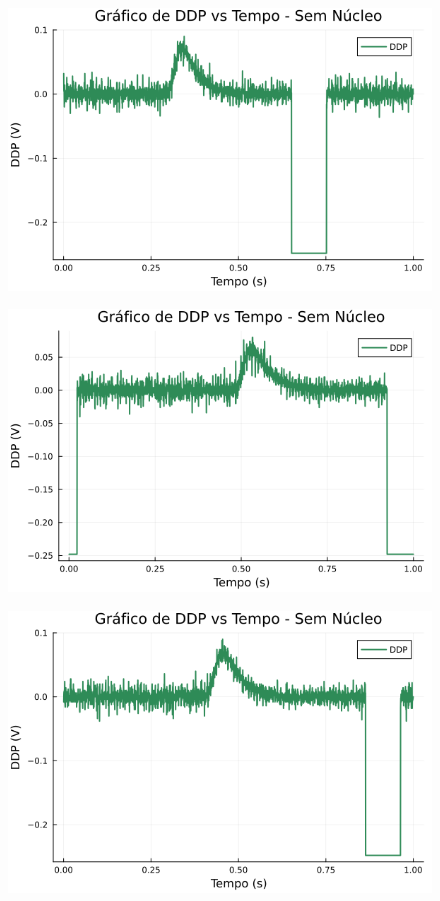 \begin{center}
\begin{multicols}{2}
\begin{figure}[H]
    \centering
    \includegraphics[width=1.0\linewidth]{figuras/grafico_dados2_F0009CH1.png}
\end{figure}

\begin{figure}[H]
    \centering
    \includegraphics[width=1.0\linewidth]{figuras/grafico_dados2_F0010CH1.png}
\end{figure}

\begin{figure}[H]
    \centering
    \includegraphics[width=1.0\linewidth]{figuras/grafico_dados2_F0011CH1.png}
\end{figure}


\end{multicols}
\end{center}
